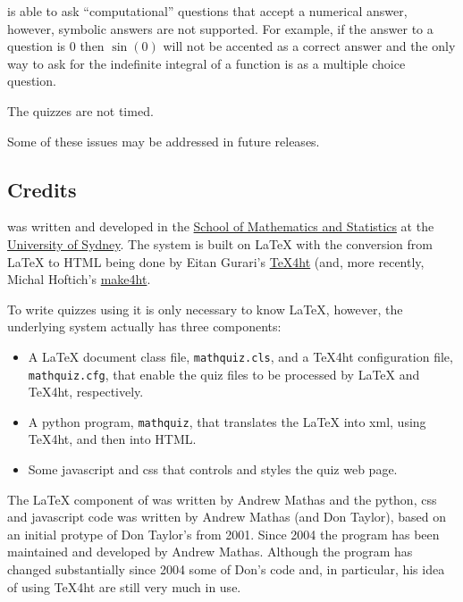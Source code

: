 \documentclass[svgnames]{article}
\begin{document}
    \MathQuiz is able to ask ``computational'' questions that accept a
    numerical answer, however, symbolic answers are not supported.
    For example, if the answer to a question is $0$ then $\sin(0)$ will
    not be accented as a correct answer and the only way to ask for the
    indefinite integral of a function is as a multiple choice question.

    The quizzes are not timed.

    Some of these issues may be addressed in future releases.

\subsection{Credits}
    \MathQuiz{} was written and developed in the
    \href{http://www.maths.usyd.edu.au/}{School of Mathematics and
    Statistics} at the \href{http://www.usyd.edu.au/}{University of
    Sydney}.  The system is built on \LaTeX{} with the conversion from
    \LaTeX{} to HTML being done by Eitan Gurari's
    \href{http://www.cis.ohio-state.edu/~gurari/TeX4ht/mn.html}{TeX4ht}
    (and, more recently, Michal Hoftich's
    \href{https://github.com/michal-h21/make4ht}{make4ht}.

    To write quizzes using \MathQuiz it is only necessary to know
    \LaTeX, however, the underlying \MathQuiz system actually has three components:
    \begin{itemize}
      \item A \LaTeX{} document class file, \texttt{mathquiz.cls}, and
      a \TeX 4ht configuration file, \texttt{mathquiz.cfg}, that enable the
      quiz files to be processed by \LaTeX{} and \TeX 4ht, respectively.
      \item A python program, \texttt{mathquiz}, that translates the
      \LaTeX{} into xml, using \TeX 4ht, and then into HTML.
      \item Some javascript and css that controls and styles the quiz web page.
    \end{itemize}

   The \LaTeX{} component of \MathQuiz{} was written by Andrew Mathas
   and the python, css and javascript code was written by Andrew Mathas
   (and Don Taylor), based on an initial protype of Don Taylor's from
   2001.  Since 2004 the program has been maintained and developed by
   Andrew Mathas. Although the program has changed substantially since
   2004 some of Don's code and, in particular, his idea of using
   \TeX4ht are still very much in use.
\end{document}
